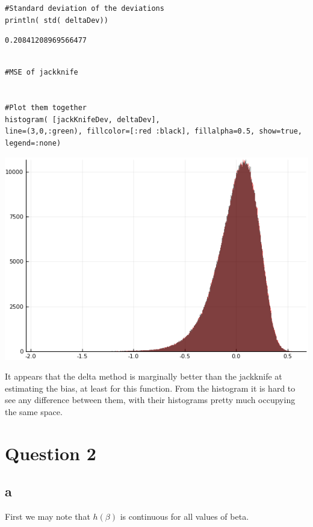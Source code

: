 \documentclass[11pt]{article}
\begin{document}
\begin{verbatim}
#Standard deviation of the deviations
println( std( deltaDev))
\end{verbatim}
\begin{verbatim}
0.20841208969566477
\end{verbatim}

\begin{verbatim}

#MSE of jackknife


#Plot them together
histogram( [jackKnifeDev, deltaDev],
line=(3,0,:green), fillcolor=[:red :black], fillalpha=0.5, show=true,
legend=:none)
\end{verbatim}
\includegraphics[width=\linewidth]{figures/Schwieg_HW6_1_1pdf}


It appears that the delta method is marginally better than the
jackknife at estimating the bias, at least for this function. From the
histogram it is hard to see any difference between them, with their
histograms pretty much occupying the same space.



\section{Question 2}
\label{sec-2}

\subsection{a}
\label{sec-2-1}
First we may note that $h(\beta)$ is continuous for all values of beta.
\end{document}
